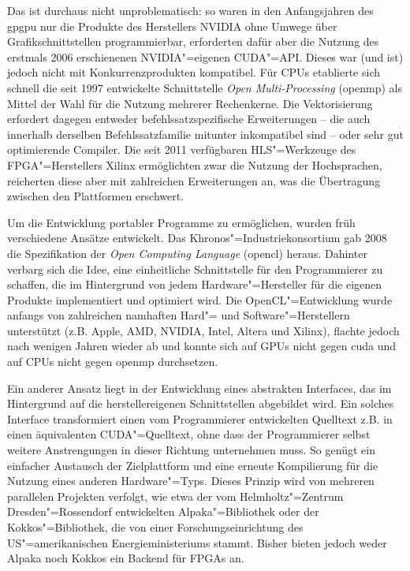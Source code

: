 Das ist durchaus nicht unproblematisch: so waren in den Anfangsjahren des
\gls{gpgpu} nur die Produkte des Herstellers NVIDIA ohne Umwege über
Grafikschnittstellen programmierbar, erforderten dafür aber die Nutzung des
erstmals 2006 erschienenen NVIDIA"=eigenen CUDA"=API. Dieses war (und ist)
jedoch nicht mit Konkurrenzprodukten kompatibel. Für CPUs etablierte sich
schnell die seit 1997 entwickelte Schnittstelle \textit{Open Multi-Processing}
(\gls{openmp}) als Mittel der Wahl für die Nutzung mehrerer Rechenkerne. Die
Vektorisierung erfordert dagegen entweder befehlssatzspezifische Erweiterungen
-- die auch innerhalb derselben Befehlssatzfamilie mitunter inkompatibel sind --
oder sehr gut optimierende Compiler. Die seit 2011 verfügbaren HLS"=Werkzeuge
des FPGA"=Herstellers Xilinx ermöglichten zwar die Nutzung der Hochsprachen,
reicherten diese aber mit zahlreichen Erweiterungen an, was die Übertragung
 zwischen den Plattformen erschwert.

Um die Entwicklung portabler Programme zu ermöglichen, wurden früh verschiedene
Ansätze entwickelt. Das Khronos"=Industriekonsortium gab 2008 die Spezifikation
der \textit{Open Computing Language} (\gls{opencl}) heraus. Dahinter verbarg sich
die Idee, eine einheitliche Schnittstelle für den Programmierer zu schaffen, die
im Hintergrund von jedem Hardware"=Hersteller für die eigenen Produkte
implementiert und optimiert wird. Die OpenCL"=Entwicklung wurde anfangs von
zahlreichen namhaften Hard"= und Software"=Herstellern unterstützt (z.B. Apple,
AMD, NVIDIA, Intel, Altera und Xilinx), flachte jedoch nach wenigen Jahren
wieder ab und konnte sich auf GPUs nicht gegen \gls{cuda} und auf CPUs nicht
gegen \gls{openmp} durchsetzen.

Ein anderer Ansatz liegt in der Entwicklung eines abstrakten Interfaces, das im
Hintergrund auf die herstellereigenen Schnittstellen abgebildet wird. Ein
solches Interface transformiert einen vom Programmierer entwickelten Quelltext
z.B. in einen äquivalenten CUDA"=Quelltext, ohne dass der Programmierer selbst
weitere Anstrengungen in dieser Richtung unternehmen muss. So genügt ein
einfacher Austausch der Zielplattform und eine erneute Kompilierung für die
Nutzung eines anderen Hardware"=Typs. Dieses Prinzip wird von mehreren
parallelen Projekten verfolgt, wie etwa der vom Helmholtz"=Zentrum
Dresden"=Rossendorf entwickelten Alpaka"=Bibliothek oder der Kokkos"=Bibliothek,
die von einer Forschungseinrichtung des US"=amerikanischen Energieministeriums
stammt. Bisher bieten jedoch weder Alpaka noch Kokkos ein Backend für FPGAs an.

